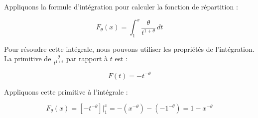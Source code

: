 \documentclass[11pt]{beamer}
\begin{document}
\begin{frame}
Appliquons la formule d'intégration pour calculer la fonction de répartition :

\[ F_\theta(x) = \int_{1}^{x} \frac{\theta}{t^{1+\theta}} \, dt \]

Pour résoudre cette intégrale, nous pouvons utiliser les propriétés de l'intégration. La primitive de $\frac{\theta}{t^{1+\theta}}$ par rapport à $t$ est :

\[ F(t) = -t^{-\theta} \]

Appliquons cette primitive à l'intégrale :

\[ F_\theta(x) = \left[-t^{-\theta}\right] \Bigg|_{1}^{x} = -\left(x^{-\theta}\right) - \left(-1^{-\theta}\right) = 1 - x^{-\theta} \]
	
\end{frame}
\end{document}
